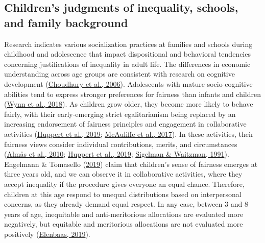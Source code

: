 \documentclass[
  letterpaper,
  DIV=11,
  numbers=noendperiod]{scrartcl}
\begin{document}
\hypertarget{childrens-judgments-of-inequality-schools-and-family-background}{%
\subsection{Children's judgments of inequality, schools, and family
background}\label{childrens-judgments-of-inequality-schools-and-family-background}}

Research indicates various socialization practices at families and
schools during childhood and adolescence that impact dispositional and
behavioral tendencies concerning justifications of inequality in adult
life. The differences in economic understanding across age groups are
consistent with research on cognitive development
(\protect\hyperlink{ref-choudhury_social_2006}{Choudhury et al., 2006}).
Adolescents with mature socio-cognitive abilities tend to express
stronger preferences for fairness than infants and children
(\protect\hyperlink{ref-wynn_not_2018}{Wynn et al., 2018}). As children
grow older, they become more likely to behave fairly, with their
early-emerging strict egalitarianism being replaced by an increasing
endorsement of fairness principles and engagement in collaborative
activities (\protect\hyperlink{ref-huppert_development_2019}{Huppert et
al., 2019};
\protect\hyperlink{ref-mcauliffe_developmental_2017}{McAuliffe et al.,
2017}). In these activities, their fairness views consider individual
contributions, merits, and circumstances
(\protect\hyperlink{ref-almas_fairness_2010}{Almås et al., 2010};
\protect\hyperlink{ref-huppert_development_2019}{Huppert et al., 2019};
\protect\hyperlink{ref-sigelman_development_1991}{Sigelman \& Waitzman,
1991}). Engelmann \& Tomasello
(\protect\hyperlink{ref-engelmann_children_2019}{2019}) claim that
children's sense of fairness emerges at three years old, and we can
observe it in collaborative activities, where they accept inequality if
the procedure gives everyone an equal chance. Therefore, children at
this age respond to unequal distributions based on interpersonal
concerns, as they already demand equal respect. In any case, between 3
and 8 years of age, inequitable and anti-meritorious allocations are
evaluated more negatively, but equitable and meritorious allocations are
not evaluated more positively
(\protect\hyperlink{ref-elenbaas_unfairness_2019}{Elenbaas, 2019}).
\end{document}

